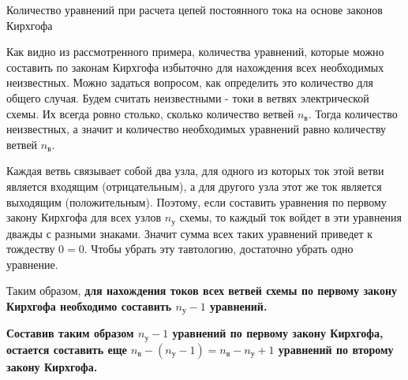 \documentclass[10pt, pdf, hyperref={unicode},handout]{beamer}
\begin{document}
\begin{frame}{Количество уравнений при расчета цепей постоянного тока на основе законов Кирхгофа}
  \begin{block}

    \small{

      Как видно из рассмотренного примера, количества уравнений, которые можно составить по законам Кирхгофа избыточно для нахождения всех необходимых неизвестных. Можно задаться вопросом, как определить это количество для общего случая. Будем считать неизвестными - токи в ветвях электрической схемы. Их всегда ровно столько, сколько количество ветвей $n_{\text{в}}$. Тогда количество неизвестных, а значит и количество необходимых уравнений равно количеству ветвей $n_{\text{в}}$.

      Каждая ветвь связывает собой два узла, для одного из которых ток этой ветви является входящим (отрицательным), а для другого узла этот же ток является выходящим (положительным). Поэтому, если составить уравнения по первому закону Кирхгофа для всех узлов $n_{\text{у}}$ схемы, то каждый ток войдет в эти уравнения дважды с разными знаками. Значит сумма всех таких уравнений приведет к тождеству $0=0$. Чтобы убрать эту тавтологию, достаточно убрать одно уравнение.

      Таким образом, \textbf{для нахождения токов всех ветвей схемы по первому закону Кирхгофа необходимо составить $n_{\text{у}}-1$ уравнений.}

      \textbf{Составив таким образом $n_{\text{у}}-1$ уравнений по первому закону Кирхгофа, остается составить еще $n_{\text{в}}-(n_{\text{у}}-1)=n_{\text{в}}-n_{\text{у}}+1$ уравнений по второму закону Кирхгофа.}
}
  \end{block}
  
\end{frame}
\end{document}

